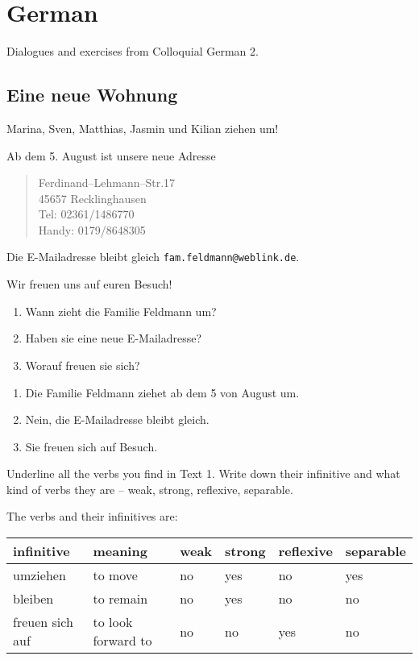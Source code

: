 \chapter{German}
Dialogues and exercises from Colloquial German 2.

\section{Eine neue Wohnung}

\begin{exercise}[Text]
Marina, Sven, Matthias, Jasmin und Kilian ziehen um!

Ab dem 5. August ist unsere neue Adresse
\begin{quote}
  Ferdinand--Lehmann--Str.\@ 17\\
  45657 Recklinghausen\\
  Tel: 02361/1486770\\
  Handy: 0179/8648305
\end{quote}
Die E-Mailadresse bleibt gleich \texttt{fam.feldmann@weblink.de}.

Wir freuen uns auf euren Besuch!
\end{exercise}

\begin{exercise}
  \hfill
  \begin{enumerate}[label=\arabic*.]
  \item Wann zieht die Familie Feldmann um?
  \item Haben sie eine neue E-Mailadresse?
  \item Worauf freuen sie sich?
  \end{enumerate}
\end{exercise}
\begin{solution}\hfill
  \begin{enumerate}[label=\arabic*.]
  \item Die Familie Feldmann ziehet ab dem 5 von August um.
  \item Nein, die E-Mailadresse bleibt gleich.
  \item Sie freuen sich auf Besuch.
  \end{enumerate}
\end{solution}

\begin{exercise}
  Underline all the verbs you find in Text 1. Write down their infinitive
  and what kind of verbs they are -- weak, strong, reflexive, separable.
\end{exercise}
\begin{solution}
  The verbs and their infinitives are:
  \begin{center}
  \begin{tabular}{|l|l|l|l|l|l|}
    \hline
    infinitive&meaning&weak&strong&reflexive&separable\\
    \hline
    umziehen&to move&no&yes&no&yes\\
    bleiben&to remain&no&yes&no&no\\
    freuen sich auf&to look forward to&no&no&yes&no\\
    \hline
  \end{tabular}
  \end{center}
\end{solution}

